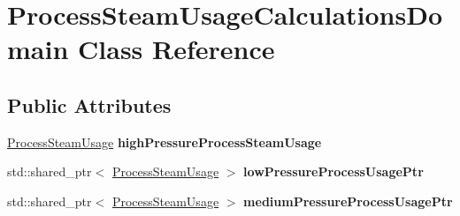\hypertarget{class_process_steam_usage_calculations_domain}{}\section{Process\+Steam\+Usage\+Calculations\+Domain Class Reference}
\label{class_process_steam_usage_calculations_domain}
\subsection*{Public Attributes}
\begin{DoxyCompactItemize}
\item 
\mbox{\label{class_process_steam_usage_calculations_domain_a290122ef4f80b94160b3c7d0d1c86758}} 
\hyperlink{class_process_steam_usage}{Process\+Steam\+Usage} {\bfseries high\+Pressure\+Process\+Steam\+Usage}
\item 
\mbox{\label{class_process_steam_usage_calculations_domain_ade42d8e448f9eb179897db44b2114df1}} 
std\+::shared\+\_\+ptr$<$ \hyperlink{class_process_steam_usage}{Process\+Steam\+Usage} $>$ {\bfseries low\+Pressure\+Process\+Usage\+Ptr}
\item 
\mbox{\label{class_process_steam_usage_calculations_domain_a449471ed2ce13eabc2e479228e9f9408}} 
std\+::shared\+\_\+ptr$<$ \hyperlink{class_process_steam_usage}{Process\+Steam\+Usage} $>$ {\bfseries medium\+Pressure\+Process\+Usage\+Ptr}
\end{DoxyCompactItemize}
